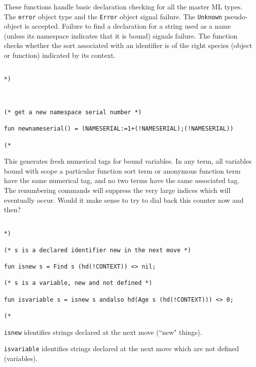 \documentclass{article}
\begin{document}
These functions handle basic declaration checking for all the master ML types.  The {\tt error} object type and the {\tt Error} object signal failure.  The {\tt Unknown} pseudo-object is accepted.  Failure to find a declaration for a string used as a name (unless its namespace indicates that it is bound) signals failure.  The function checks whether the sort associated with an identifier is of the right species (object or function) indicated by its context.

\begin{verbatim}

*)



(* get a new namespace serial number *)

fun newnameserial() = (NAMESERIAL:=1+(!NAMESERIAL);(!NAMESERIAL))

(*

\end{verbatim}

This generates fresh numerical tags for bound variables.  In any term, all variables bound with scope a particular function sort term or anonymous function term have the same numerical tag, and no two terms have the same associated tag.  The renumbering commands will suppress the very large indices which will eventually occur.  Would it make sense to try to dial back this counter now and then?

\begin{verbatim}

*)

(* s is a declared identifier new in the next move *)

fun isnew s = Find s (hd(!CONTEXT)) <> nil;

(* s is a variable, new and not defined *)

fun isvariable s = isnew s andalso hd(Age s (hd(!CONTEXT))) <> 0;

(*

\end{verbatim}

{\tt isnew} identifies strings declared at the next move (``new" things).

{\tt isvariable} identifies strings declared at the next move which are not defined (variables).
\end{document}

